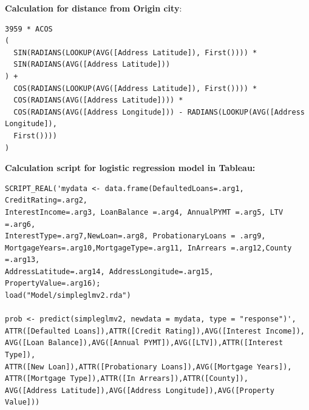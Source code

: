 \textbf{Calculation for distance from Origin city}:
\begin{verbatim}
3959 * ACOS
(
  SIN(RADIANS(LOOKUP(AVG([Address Latitude]), First()))) * 
  SIN(RADIANS(AVG([Address Latitude]))
) +
  COS(RADIANS(LOOKUP(AVG([Address Latitude]), First()))) * 
  COS(RADIANS(AVG([Address Latitude]))) * 
  COS(RADIANS(AVG([Address Longitude])) - RADIANS(LOOKUP(AVG([Address Longitude]),
  First())))
)
\end{verbatim}


\textbf{Calculation script for logistic regression model in Tableau:}
\begin{verbatim}
SCRIPT_REAL('mydata <- data.frame(DefaultedLoans=.arg1, CreditRating=.arg2,
InterestIncome=.arg3, LoanBalance =.arg4, AnnualPYMT =.arg5, LTV =.arg6,
InterestType=.arg7,NewLoan=.arg8, ProbationaryLoans = .arg9, 
MortgageYears=.arg10,MortgageType=.arg11, InArrears =.arg12,County =.arg13,
AddressLatitude=.arg14, AddressLongitude=.arg15, PropertyValue=.arg16);
load("Model/simpleglmv2.rda")

prob <- predict(simpleglmv2, newdata = mydata, type = "response")',
ATTR([Defaulted Loans]),ATTR([Credit Rating]),AVG([Interest Income]),
AVG([Loan Balance]),AVG([Annual PYMT]),AVG([LTV]),ATTR([Interest Type]),
ATTR([New Loan]),ATTR([Probationary Loans]),AVG([Mortgage Years]),
ATTR([Mortgage Type]),ATTR([In Arrears]),ATTR([County]),
AVG([Address Latitude]),AVG([Address Longitude]),AVG([Property Value]))
\end{verbatim}





